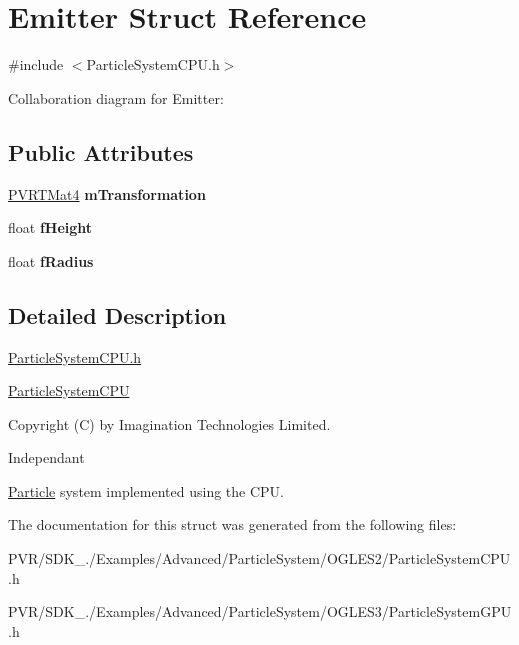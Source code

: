 \hypertarget{struct_emitter}{\section{Emitter Struct Reference}
\label{struct_emitter}
}


{\ttfamily \#include $<$Particle\+System\+C\+P\+U.\+h$>$}



Collaboration diagram for Emitter\+:
\subsection*{Public Attributes}
\begin{DoxyCompactItemize}
\item 
\hypertarget{struct_emitter_a9e4ecdfa8b727b51ad7aa5c1acde148f}{\hyperlink{struct_p_v_r_t_mat4}{P\+V\+R\+T\+Mat4} {\bfseries m\+Transformation}}\label{struct_emitter_a9e4ecdfa8b727b51ad7aa5c1acde148f}

\item 
\hypertarget{struct_emitter_a499aaa6300ba93a17c58ff3805e699d3}{float {\bfseries f\+Height}}\label{struct_emitter_a499aaa6300ba93a17c58ff3805e699d3}

\item 
\hypertarget{struct_emitter_ad6e9d129cddd42f1e0859b534ef326a1}{float {\bfseries f\+Radius}}\label{struct_emitter_ad6e9d129cddd42f1e0859b534ef326a1}

\end{DoxyCompactItemize}


\subsection{Detailed Description}


  \hyperlink{_particle_system_c_p_u_8h_source}{Particle\+System\+C\+P\+U.\+h}

\hyperlink{class_particle_system_c_p_u}{Particle\+System\+C\+P\+U}

Copyright (C) by Imagination Technologies Limited.

Independant

\hyperlink{struct_particle}{Particle} system implemented using the C\+P\+U. 

The documentation for this struct was generated from the following files\+:\begin{DoxyCompactItemize}
\item 
P\+V\+R/\+S\+D\+K\+\_./\+Examples/\+Advanced/\+Particle\+System/\+O\+G\+L\+E\+S2/Particle\+System\+C\+P\+U.\+h\item 
P\+V\+R/\+S\+D\+K\+\_./\+Examples/\+Advanced/\+Particle\+System/\+O\+G\+L\+E\+S3/Particle\+System\+G\+P\+U.\+h\end{DoxyCompactItemize}

